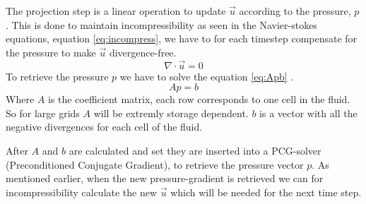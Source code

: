 The projection step is a linear operation to update $\vec{u}$ according to the pressure, $p$.
This is done to maintain incompressibility as seen in the Navier-stokes equations, equation \eqref{eq:incompress}, we have to for each timestep compensate for the pressure to make $\vec{u}$ divergence-free.
\begin{equation}
\label{eq:incompress}
	\nabla\cdot \vec{u}= 0
\end{equation}
To retrieve the pressure $p$ we have to solve the equation \eqref{eq:Apb} \cite{bridson}.
\begin{equation}
\label{eq:Apb}
	Ap = b
\end{equation}
Where $A$ is the coefficient matrix, each row corresponds to one cell in the fluid. So for large grids $A$ will be extremly storage dependent. $b$ is a vector with all the negative divergences for each cell of the fluid. 

After $A$ and $b$ are calculated and set they are inserted into a PCG-solver (Preconditioned Conjugate Gradient), to retrieve the pressure vector $p$.
As mentioned earlier, when the new pressure-gradient is retrieved we can for incompressibility calculate the new $\vec{u}$ which will be needed for the next time step.

